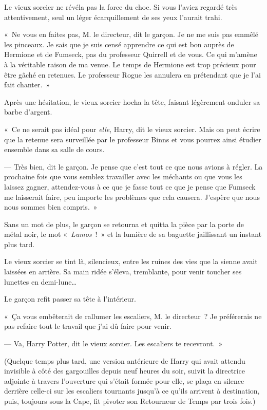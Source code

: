 Le vieux sorcier ne révéla pas la force du choc. Si vous l'aviez regardé très attentivement, seul un léger écarquillement de ses yeux l'aurait trahi.

«~Ne vous en faites pas, M. le directeur, dit le garçon. Je ne me suis pas emmêlé les pinceaux. Je sais que je suis censé apprendre ce qui est bon auprès de Hermione et de Fumseck, pas du professeur Quirrell et de vous. Ce qui m'amène à la véritable raison de ma venue. Le temps de Hermione est trop précieux pour être gâché en retenues. Le professeur Rogue les annulera en prétendant que je l'ai fait chanter.~»

Après une hésitation, le vieux sorcier hocha la tête, faisant légèrement onduler sa barbe d'argent.

«~Ce ne serait pas idéal pour \emph{elle}, Harry, dit le vieux sorcier. Mais on peut écrire que la retenue sera surveillée par le professeur Binns et vous pourrez ainsi étudier ensemble dans sa salle de cours.

--- Très bien, dit le garçon. Je pense que c'est tout ce que nous avions à régler. La prochaine fois que vous semblez travailler avec les méchants ou que vous les laissez gagner, attendez-vous à ce que je fasse tout ce que je pense que Fumseck me laisserait faire, peu importe les problèmes que cela causera. J'espère que nous nous sommes bien compris.~»

Sans un mot de plus, le garçon se retourna et quitta la pièce par la porte de métal noir, le mot «~\emph{Lumos}~!~» et la lumière de sa baguette jaillissant un instant plus tard.

Le vieux sorcier se tint là, silencieux, entre les ruines des vies que la sienne avait laissées en arrière. Sa main ridée s'éleva, tremblante, pour venir toucher ses lunettes en demi-lune…

Le garçon refit passer sa tête à l'intérieur.

«~Ça vous embêterait de rallumer les escaliers, M. le directeur~? Je préférerais ne pas refaire tout le travail que j'ai dû faire pour venir.

--- Va, Harry Potter, dit le vieux sorcier. Les escaliers te recevront.~»

(Quelque temps plus tard, une version antérieure de Harry qui avait attendu invisible à côté des gargouilles depuis neuf heures du soir, suivit la directrice adjointe à travers l'ouverture qui s'était formée pour elle, se plaça en silence derrière celle-ci sur les escaliers tournants jusqu'à ce qu'ils arrivent à destination, puis, toujours sous la Cape, fit pivoter son Retourneur de Temps par trois fois.)

